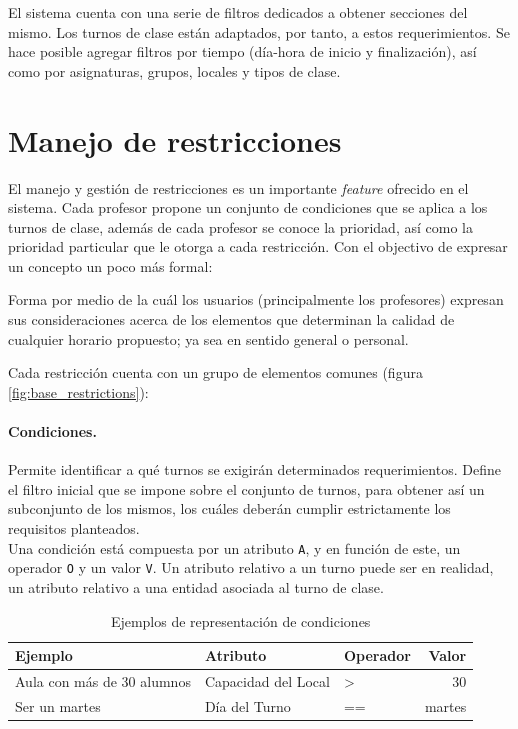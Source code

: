 El sistema cuenta con una serie de filtros dedicados a obtener secciones del mismo. Los turnos de clase están adaptados, por tanto, a estos requerimientos. Se hace posible agregar filtros por tiempo (día-hora de inicio y finalización), así como por asignaturas, grupos, locales y tipos de clase. 

\section{Manejo de restricciones}

El manejo y gestión de restricciones es un importante \textit{feature} ofrecido en el sistema. Cada profesor propone un conjunto de condiciones que se aplica a los turnos de clase, además de cada profesor se conoce la prioridad, así como la prioridad particular que le otorga a cada restricción. 
Con el objectivo de expresar un concepto un poco más formal: 
\begin{dfn}[Restricción]
	Forma por medio de la cuál los usuarios (principalmente los profesores) expresan sus consideraciones acerca de los elementos que determinan la calidad de cualquier horario propuesto; ya sea en sentido general o personal.
\end{dfn} 

Cada restricción cuenta con un grupo de elementos comunes (figura \ref{fig:base_restrictions}):\\

\paragraph{Condiciones.}
Permite identificar a qué turnos se exigirán determinados requerimientos. Define el filtro inicial que se impone sobre el conjunto de turnos, para obtener así un subconjunto de los mismos, los cuáles deberán cumplir estrictamente los requisitos planteados.\\
	
Una condición está compuesta por un atributo \texttt{A}, y en función de este, un operador \texttt{O} y un valor \texttt{V}. Un atributo relativo a un turno puede ser en realidad, un atributo relativo a una entidad asociada al turno de clase.\\

\begin{table}[h]
	\centering
	\begin{tabular}[c]{l|l|l|r}
		\textbf{Ejemplo}                   & \textbf{Atributo}     & \textbf{Operador} & \textbf{Valor} \\ 
		\hline 
		Aula con más de 30 alumnos         &  Capacidad del Local  & >                 & 30             \\ 
		Ser un martes					   & Día del Turno         & ==                & martes
	\end{tabular}
	\caption{Ejemplos de representación de condiciones}
	\label{tab:conditions}		
\end{table}


